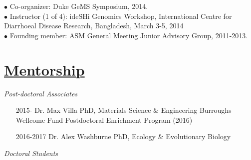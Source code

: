 \documentclass[overlapped,line,11pt]{res}
\begin{document}
\begin{resume}
\vspace{-10mm}
\hangindent=0.5in $\bullet$\hspace{.1in} Co-organizer: Duke GeMS
Symposium, 2014. \\

\vspace{-10mm}
\hangindent=0.5in $\bullet$\hspace{.1in} Instructor (1 of 4): ideSHi
Genomics Workshop, International Centre for Diarrhoeal
Disease Research, Bangladesh, March 3-5, 2014 \\

\vspace{-10mm}
\hangindent=0.5in $\bullet$\hspace{.1in} Founding member: ASM General Meeting
Junior Advisory Group, 2011-2013. 



\section{\underline{\sc Mentorship}}
\vspace{.1in}

\emph{Post-doctoral Associates}
\vspace{.1in}

\begin{itemize}[leftmargin=2cm, style=sameline, itemsep=0mm]

\item[2015-] Dr. Max Villa \newline 
  PhD, Materials Science \& Engineering \newline
  Burroughs Wellcome Fund Postdoctoral Enrichment Program (2016)
\item[2016-2017] Dr. Alex Washburne \newline 
  PhD, Ecology \& Evolutionary Biology 
  
  
\end{itemize}

\vspace{-.1in}
\emph{Doctoral Students}
\vspace{.1in}

\begin{itemize}[leftmargin=2cm, style=sameline, itemsep=0mm]


\end{itemize}
\end{resume}
\end{document}
